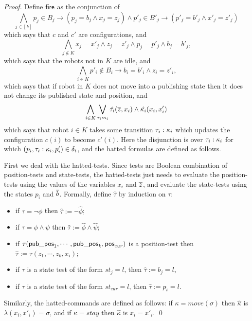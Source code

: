 \begin{proof}
Define $\mathsf{fire}$ as the conjunction of 
 \[
\bigwedge_{j \in [k]} p_j \in B_j \to (p_j = b_j \wedge x_j = z_j) \wedge  p'_j \in B'_j \to (p'_j = b'_j \wedge x'_j = z'_j) 
 \]
which says that $c$ and $c'$ are configurations, 
and 
\[ 
\bigwedge_{j \not \in K} x_j = x'_j \wedge z_j = z'_j \wedge p_j = p'_j \wedge b_j = b'_j,
\]
which says that the robots not in $K$ are idle, 
and
\[
\bigwedge_{i \in K} p'_i \not \in B_i  \to b_i = b'_i \wedge z_i = z'_i,
\]
which says that if robot in $K$ does not move into a publishing state then it does not change its published state and position,  
and
\[
\bigwedge_{i \in K} \bigvee_{\tau_i:\kappa_i} \hat{\tau_i}(\overline{z},x_i) \wedge \hat{\kappa_i}(x_i,x'_i)
\]
which says that robot $i \in K$ takes some transition $\tau_i:\kappa_i$ which updates the configuration $c(i)$ to become $c'(i)$. 
Here the disjunction is over $\tau_i:\kappa_i$ for which
$(p_i,\tau_i:\kappa_i,p'_i) \in \delta_i$,  
and the hatted formulas are defined as follows.

First we deal with the hatted-tests.
Since tests are Boolean combination of position-tests and state-tests, the hatted-tests just needs to evaluate the position-tests using the 
values of the variables $x_i$ and $\overline{z}$, and evaluate the state-tests using the states $p_i$ and $\overline{b}$. 
Formally, define $\hat{\tau}$ by induction on $\tau$:
\begin{itemize}
 \item if $\tau = \neg \phi$ then $\hat{\tau} := \neg \hat{\phi}$;
 \item if $\tau = \phi \wedge \psi$ then $\hat{\tau} := \hat{\phi} \wedge \hat{\psi}$;
 \item if $\tau(\mathsf{pub\_pos}_1,\cdots,\mathsf{pub\_pos}_k,\mathsf{pos}_{cur})$ is a position-test then $\hat{\tau} := \tau(z_1,\cdots,z_k,x_i)$;
 \item if $\tau$ is a state test of the form $st_j = l$, then 
 $\hat{\tau} := b_j = l$,
 \item  if $\tau$ is a state test of the form $st_{cur} = l$, then 
 $\hat{\tau} := p_i = l$.
\end{itemize}              
    
Similarly, the hatted-commands are defined as follows: if $\kappa = move(\sigma)$ then $\hat{\kappa}$ is $\lambda(x_i,x'_i) = \sigma$, and 
if $\kappa = stay$ then $\hat{\kappa}$ is $x_i = x'_i$. \qed
\end{proof}


% 

